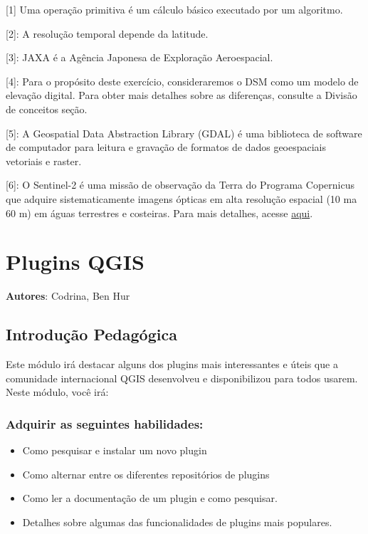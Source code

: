 \documentclass[
  portuguese,
]{krantz}
\providecommand{\tightlist}{%
  \setlength{\itemsep}{0pt}\setlength{\parskip}{0pt}}
\begin{document}
{[}1{]} Uma operação primitiva é um cálculo básico executado por um algoritmo.

{[}2{]}: A resolução temporal depende da latitude.

{[}3{]}: JAXA é a Agência Japonesa de Exploração Aeroespacial.

{[}4{]}: Para o propósito deste exercício, consideraremos o DSM como um modelo de elevação digital. Para obter mais detalhes sobre as diferenças, consulte a Divisão de conceitos seção.

{[}5{]}: A Geospatial Data Abstraction Library (GDAL) é uma biblioteca de software de computador para leitura e gravação de formatos de dados geoespaciais vetoriais e raster.

{[}6{]}: O Sentinel-2 é uma missão de observação da Terra do Programa Copernicus que adquire sistematicamente imagens ópticas em alta resolução espacial (10 ma 60 m) em águas terrestres e costeiras. Para mais detalhes, acesse \href{https://sentinel.esa.int/web/sentinel/missions/sentinel-2}{aqui}.

\hypertarget{plugins-qgis}{%
\chapter{Plugins QGIS}\label{plugins-qgis}}

\textbf{Autores}: Codrina, Ben Hur

\hypertarget{introduuxe7uxe3o-pedaguxf3gica-10}{%
\section{Introdução Pedagógica}\label{introduuxe7uxe3o-pedaguxf3gica-10}}

Este módulo irá destacar alguns dos plugins mais interessantes e úteis que a comunidade internacional QGIS desenvolveu e disponibilizou para todos usarem. Neste módulo, você irá:

\hypertarget{adquirir-as-seguintes-habilidades}{%
\subsection{Adquirir as seguintes habilidades:}\label{adquirir-as-seguintes-habilidades}}

\begin{itemize}
\tightlist
\item
  Como pesquisar e instalar um novo plugin
\item
  Como alternar entre os diferentes repositórios de plugins
\item
  Como ler a documentação de um plugin e como pesquisar.
\item
  Detalhes sobre algumas das funcionalidades de plugins mais populares.
\end{itemize}
\end{document}
